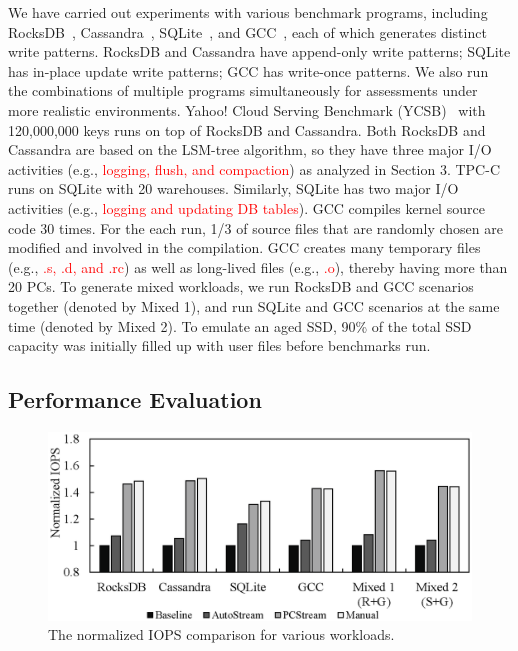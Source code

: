 We have carried out experiments with various benchmark programs, including
RocksDB~\cite{RocksDB}, Cassandra~\cite{Cassandra}, 
SQLite~\cite{SQLite}, and GCC~\cite{GCC}, each of
which generates distinct write patterns.  RocksDB and Cassandra have
append-only write patterns; SQLite has in-place update write patterns; GCC has
write-once patterns.  We also run the combinations of multiple programs
simultaneously for assessments under more realistic environments.  Yahoo! Cloud
Serving Benchmark (YCSB)~\cite{YCSB} with 120,000,000 keys runs on top of
RocksDB and Cassandra.  Both RocksDB and Cassandra are based on the LSM-tree
algorithm, so they have three major I/O activities (e.g.,
\textcolor{red}{logging, flush, and compaction}) as analyzed in Section 3.
TPC-C~\cite{TPCC} runs on SQLite with 20 warehouses.  Similarly, SQLite has two
major I/O activities (e.g., \textcolor{red}{logging and updating DB tables}). 
GCC compiles kernel source code 30 times. For the each run, 1/3 of source files
that are randomly chosen are modified and involved in the compilation.  GCC
creates many temporary files (e.g., \textcolor{red}{.s, .d, and .rc}) as well as long-lived
files (e.g., \textcolor{red}{.o}), thereby having more than 20 PCs.  To
generate mixed workloads, we run RocksDB and GCC scenarios together (denoted by
Mixed 1), and run SQLite and GCC scenarios at the same time (denoted by Mixed
2).
To emulate an aged SSD, 90\% of the total SSD capacity was initially filled up
with user files before benchmarks run.

\subsection{Performance Evaluation}
\begin{figure}[t]
	\centering
	\includegraphics[width=0.9\linewidth]{figure/iops}
	\caption{The normalized IOPS comparison for various workloads.}
	\label{fig:iops}
	\vspace{-20pt}
\end{figure}

